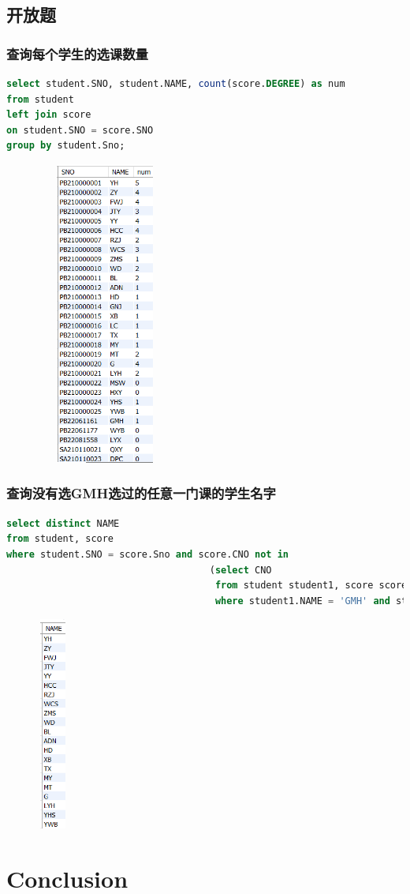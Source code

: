 \documentclass{ctexart}
\begin{document}
\subsection{开放题}
\subsubsection{查询每个学生的选课数量}
\begin{lstlisting}[language=sql]
select student.SNO, student.NAME, count(score.DEGREE) as num
from student
left join score
on student.SNO = score.SNO
group by student.Sno;
\end{lstlisting}
\begin{figure}[H]
	\centering 
	\includegraphics[height=10cm,width=4.5cm]{60.png}
	\end{figure}
\subsubsection{查询没有选GMH选过的任意一门课的学生名字}
\begin{lstlisting}[language=sql]
select distinct NAME  
from student, score 
where student.SNO = score.Sno and score.CNO not in
									(select CNO
									 from student student1, score score1
									 where student1.NAME = 'GMH' and student1.Sno = score1.Sno);
\end{lstlisting}
\begin{figure}[H]
	\centering 
	\includegraphics[height=7cm,width=1cm]{61.png}
	\end{figure}
	\section{Conclusion}
    
\end{document}
